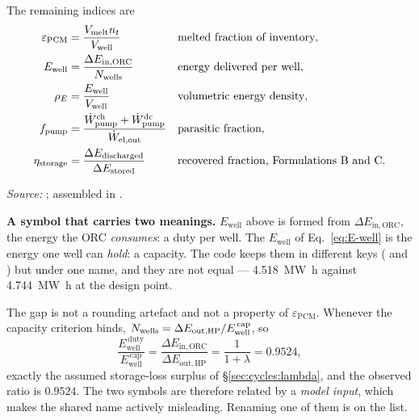 The remaining indices are
\begin{align}
  \varepsilon_{\mathrm{PCM}} &= \frac{V_{\mathrm{melt}} n_{t}}{V_{\mathrm{well}}}
    &&\text{melted fraction of inventory}, \\
  E_{\mathrm{well}} &= \frac{\Delta E_{\mathrm{in,ORC}}}{N_{\mathrm{wells}}}
    &&\text{energy delivered per well}, \\
  \rho_{E} &= \frac{E_{\mathrm{well}}}{V_{\mathrm{well}}}
    &&\text{volumetric energy density}, \\
  f_{\mathrm{pump}} &=
    \frac{\dot W_{\mathrm{pump}}^{\mathrm{ch}}
        + \dot W_{\mathrm{pump}}^{\mathrm{dc}}}{\dot W_{\mathrm{el,out}}}
    &&\text{parasitic fraction}, \\
  \eta_{\mathrm{storage}} &=
    \frac{\Delta E_{\mathrm{discharged}}}{\Delta E_{\mathrm{stored}}}
    &&\text{recovered fraction, Formulations B and C}.
\end{align}

\emph{Source:} ; assembled in .

\medskip
\noindent\textbf{A symbol that carries two meanings.} $E_{\mathrm{well}}$
above is formed from $\Delta E_{\mathrm{in,ORC}}$, the energy the ORC
\emph{consumes}: a duty per well. The $E_{\mathrm{well}}$ of
Eq.~\eqref{eq:E-well} is the energy one well can \emph{hold}: a capacity. The
code keeps them in different keys ( and
) but under one name, and they are not equal ---
\SI{4.518}{\mega\watt\hour} against \SI{4.744}{\mega\watt\hour} at the
design point.

The gap is not a rounding artefact and not a property of
$\varepsilon_{\mathrm{PCM}}$. Whenever the capacity criterion binds,
$N_{\mathrm{wells}} = \Delta E_{\mathrm{out,HP}}/E_{\mathrm{well}}^{\,\mathrm{cap}}$,
so
\begin{equation}
  \frac{E_{\mathrm{well}}^{\,\mathrm{duty}}}{E_{\mathrm{well}}^{\,\mathrm{cap}}}
  = \frac{\Delta E_{\mathrm{in,ORC}}}{\Delta E_{\mathrm{out,HP}}}
  = \frac{1}{1+\lambda} = 0.9524 ,
  \label{eq:Ewell-ratio}
\end{equation}
exactly the assumed storage-loss surplus of \S\ref{sec:cycles:lambda}, and the
observed ratio is $0.9524$. The two symbols are therefore related by a
\emph{model input}, which makes the shared name actively misleading. Renaming
one of them is on the list.
